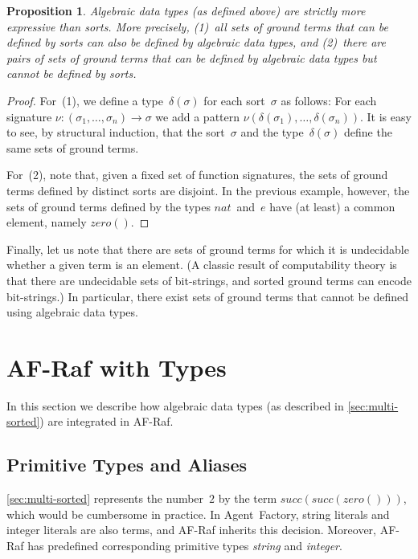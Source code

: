 \documentclass{aamas2012} %
\newtheorem{proposition}{Proposition}
\theoremstyle{remark}
\begin{document}
\begin{proposition}
Algebraic data types (as defined above) are strictly more expressive than
sorts. More precisely, (1)~all sets of ground terms that can be defined by
sorts can also be defined by algebraic data types, and (2)~there are pairs
of sets of ground terms that can be defined by algebraic data types but
cannot be defined by sorts.
\end{proposition}

\begin{proof}
For~(1), we define a type~$\delta(\sigma)$ for each sort~$\sigma$ as
follows: For each signature $\nu:(\sigma_1,\ldots,\sigma_n)\to\sigma$ we
add a pattern $\nu(\delta(\sigma_1),\ldots,\delta(\sigma_n))$. It is easy
to see, by structural induction, that the sort~$\sigma$ and the
type~$\delta(\sigma)$ define the same sets of ground terms.

For~(2), note that, given a fixed set of function signatures, the sets of
ground terms defined by distinct sorts are disjoint. In the previous
example, however, the sets of ground terms defined by the types
$\mathit{nat}$~and~$e$ have (at least) a common element, namely
$\mathit{zero}()$.
\end{proof}

Finally, let us note that there are sets of ground terms for which it is
undecidable whether a given term is an element.  (A classic result of
computability theory is that there are undecidable sets of bit-strings, and
sorted ground terms can encode bit-strings.) In particular, there exist
sets of ground terms that cannot be defined using algebraic data types.

\section{AF-Raf with Types} \label{sec:af-raf.types} %

In this section we describe how algebraic data types (as described in
\autoref{sec:multi-sorted}) are integrated in AF-Raf.

\subsection{Primitive Types and Aliases}

\autoref{sec:multi-sorted} represents the number~$2$ by the term
$\mathit{succ}(\mathit{succ}(\mathit{zero}()))$, which would be cumbersome
in practice. In Agent~Factory, string literals and integer literals are
also terms, and AF-Raf inherits this decision. Moreover, AF-Raf has
predefined corresponding primitive types \textit{string} and
\textit{integer}.
\end{document}
